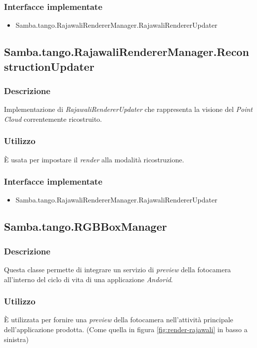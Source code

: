 \subsubsection{Interfacce implementate}
\begin{itemize}
	\item Samba.tango.RajawaliRendererManager.RajawaliRendererUpdater
\end{itemize}

\subsection{Samba.tango.RajawaliRendererManager.ReconstructionUpdater}
\subsubsection{Descrizione}
Implementazione di \emph{RajawaliRendererUpdater} che rappresenta la visione del \emph{Point Cloud} correntemente ricostruito.
\subsubsection{Utilizzo}
È usata per impostare il \emph{render} alla modalità ricostruzione.
\subsubsection{Interfacce implementate}
\begin{itemize}
	\item Samba.tango.RajawaliRendererManager.RajawaliRendererUpdater
\end{itemize}

\subsection{Samba.tango.RGBBoxManager}
\subsubsection{Descrizione}
Questa classe permette di integrare un servizio di \emph{preview} della fotocamera all'interno del ciclo di vita di una applicazione \emph{Andorid}.
\subsubsection{Utilizzo}
È utilizzata per fornire una \emph{preview} della fotocamera nell'attività principale dell'applicazione prodotta. (Come quella in figura \ref{fig:render-rajawali} in basso a sinistra)
